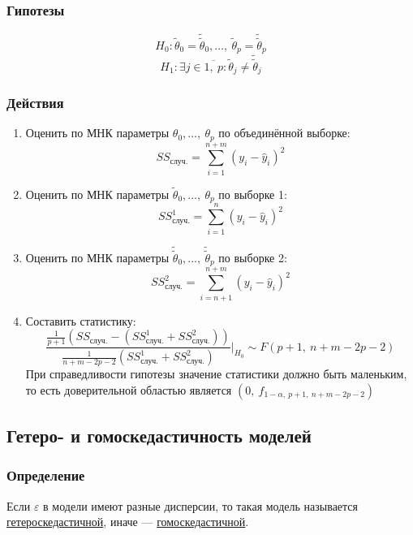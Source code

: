 \documentclass[12pt, a4paper]{article}
\begin{document}
\subsubsection*{Гипотезы}
\[
H_0: \tilde \theta_0 = \tilde{\tilde \theta}_0,\dots,\ \tilde \theta_p = \tilde{\tilde \theta}_p
\]
\[
H_1: \exists j \in \overline{1,\ p}: \tilde \theta_j \neq \tilde{\tilde \theta}_j
\]
\subsubsection*{Действия}
\begin{enumerate}
    \item Оценить по МНК параметры $\theta_0,\dots,\ \theta_p$ по объединённой выборке:
    \[
    SS_{\text{случ.}} = \sum_{i = 1}^{n + m} {\left( y_i - \hat y_i \right)}^2
    \]
    \item Оценить по МНК параметры $\tilde \theta_0,\dots,\ \theta_p$ по выборке 1:
    \[
    SS_{\text{случ.}}^1 = \sum_{i = 1}^{n} {\left( y_i - \hat y_i \right)}^2
    \]
    \item Оценить по МНК параметры $\tilde{\tilde \theta}_0,\dots,\ \tilde{\tilde \theta}_p$ по выборке 2:
    \[
    SS_{\text{случ.}}^2 = \sum_{i = n + 1}^{n + m} {\left( y_i - \hat y_i \right)}^2
    \]
    \item Составить статистику:
    \[
    \frac{ \frac{1}{p + 1} \left( SS_{\text{случ.}} - \left( SS_{\text{случ.}}^1 + SS_{\text{случ.}}^2 \right) \right)}{ \frac{1}{n + m - 2p - 2} \left( SS_{\text{случ.}}^1 + SS_{\text{случ.}}^2 \right) } \Bigg|_{H_0} \sim F(p + 1,\ n + m - 2p - 2)
    \]
    При справедливости гипотезы значение статистики должно быть маленьким, то есть доверительной областью является $(0,\ f_{1 - \alpha,\ p + 1,\ n + m - 2p - 2})$
\end{enumerate}
\subsection*{Гетеро- и гомоскедастичность моделей}
\subsubsection*{Определение}
Если $\varepsilon$ в модели имеют разные дисперсии, то такая модель называется \underline{гетероскедастичной}, иначе --- \underline{гомоскедастичной}.
\end{document}
